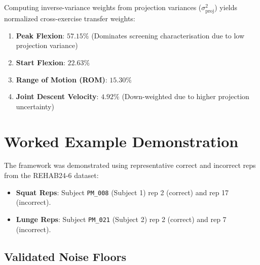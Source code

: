 Computing inverse-variance weights from projection variances ($\sigma^2_{\text{proj}}$) yields normalized cross-exercise transfer weights:
\begin{enumerate}
  \item \textbf{Peak Flexion}: \textbf{$57.15\%$} (Dominates screening characterisation due to low projection variance)
  \item \textbf{Start Flexion}: \textbf{$22.63\%$}
  \item \textbf{Range of Motion (ROM)}: \textbf{$15.30\%$}
  \item \textbf{Joint Descent Velocity}: \textbf{$4.92\%$} (Down-weighted due to higher projection uncertainty)
\end{enumerate}



\section{Worked Example Demonstration}
\label{sec:8-5-worked-example-demonstration}


The framework was demonstrated using representative correct and incorrect reps from the REHAB24-6 dataset:
\begin{itemize}
  \item \textbf{Squat Reps}: Subject \texttt{PM\_008} (Subject 1) rep 2 (correct) and rep 17 (incorrect).
  \item \textbf{Lunge Reps}: Subject \texttt{PM\_021} (Subject 2) rep 2 (correct) and rep 7 (incorrect).
\end{itemize}

\subsection{Validated Noise Floors}
\label{sec:8-5-1-validated-noise-floors}

